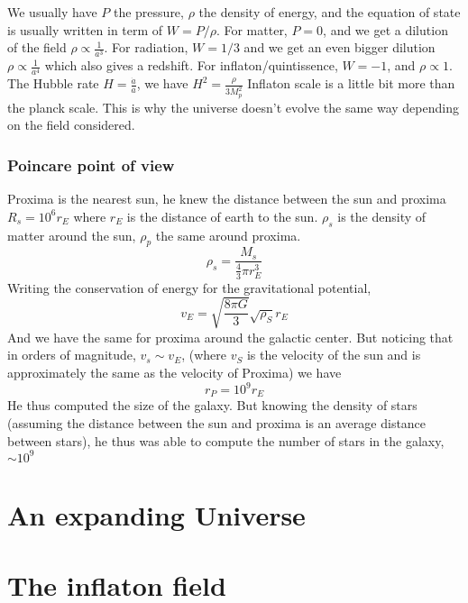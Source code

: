 \documentclass[a4paper]{book}
\theoremstyle{definition}
\theoremstyle{remark}
\begin{document}
We usually have $P$ the pressure, $\rho$ the density of energy, and the equation of state is usually written in term of $W = P/\rho$. For matter, $P=0$, and we get a dilution of the field $\rho \propto \frac{1}{a^3}$. For radiation, $W = 1/3$ and we get an even bigger dilution $\rho \propto \frac{1}{a^4}$ which also gives a redshift. For inflaton/quintissence, $W=-1$, and $\rho \propto 1$. The Hubble rate $H=\frac{\dot{a}}{a}$, we have $H^2 = \frac{\rho}{3 M_p^2}$
Inflaton scale is a little bit more than the planck scale. This is why the universe doesn't evolve the same way depending on the field considered. 

\subsection{Poincare point of view}

Proxima is the nearest sun, he knew the distance between the sun and proxima $R_s = 10^6 r_E$ where $r_E$ is the distance of earth to the sun. $\rho_s$ is the density of matter around the sun, $\rho_p$ the same around proxima. 
\begin{equation}
    \rho_s = \frac{M_s}{\frac{4}{3}\pi r_E^3}
\end{equation}
Writing the conservation of energy for the gravitational potential,
\begin{equation}
    v_E = \sqrt{\frac{8\pi G}{3}}\sqrt{\rho_S}r_E
\end{equation}
And we have the same for proxima around the galactic center. But noticing that in orders of magnitude, $v_s \sim v_E$, (where $v_S$ is the velocity of the sun and is approximately the same as the velocity of Proxima) we have 
\begin{equation}
    r_P = 10^9 r_E
\end{equation}
He thus computed the size of the galaxy. But knowing the density of stars (assuming the distance between the sun and proxima is an average distance between stars), he thus was able to compute the number of stars in the galaxy, $\sim 10^9$

\chapter{An expanding Universe}

\chapter{The inflaton field}
\end{document}
